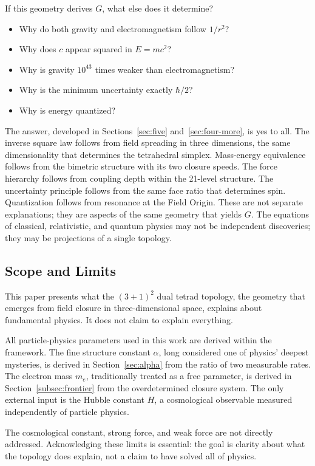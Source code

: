 \documentclass[aps,prd,preprint,superscriptaddress,showpacs,preprintnumbers,amsmath,amssymb,nofootinbib]{revtex4-2}
\begin{document}
If this geometry derives $G$, what else does it determine?
\begin{itemize}
\item Why do both gravity and electromagnetism follow $1/r^2$?
\item Why does $c$ appear squared in $E = mc^2$?
\item Why is gravity $10^{43}$ times weaker than electromagnetism?
\item Why is the minimum uncertainty exactly $\hbar/2$?
\item Why is energy quantized?
\end{itemize}

The answer, developed in Sections~\ref{sec:five} and~\ref{sec:four-more}, is yes to all. The inverse square law follows from field spreading in three dimensions, the same dimensionality that determines the tetrahedral simplex. Mass-energy equivalence follows from the bimetric structure with its two closure speeds. The force hierarchy follows from coupling depth within the 21-level structure. The uncertainty principle follows from the same face ratio that determines spin. Quantization follows from resonance at the Field Origin. These are not separate explanations; they are aspects of the same geometry that yields $G$. The equations of classical, relativistic, and quantum physics may not be independent discoveries; they may be projections of a single topology.

\subsection{Scope and Limits}
\label{subsec:limits}

This paper presents what the $(3+1)^2$ dual tetrad topology, the geometry that emerges from field closure in three-dimensional space, explains about fundamental physics. It does not claim to explain everything.

All particle-physics parameters used in this work are derived within the framework. The fine structure constant $\alpha$, long considered one of physics' deepest mysteries, is derived in Section~\ref{sec:alpha} from the ratio of two measurable rates. The electron mass $m_e$, traditionally treated as a free parameter, is derived in Section~\ref{subsec:frontier} from the overdetermined closure system. The only external input is the Hubble constant $H$, a cosmological observable measured independently of particle physics.

The cosmological constant, strong force, and weak force are not directly addressed. Acknowledging these limits is essential: the goal is clarity about what the topology does explain, not a claim to have solved all of physics.
\end{document}
